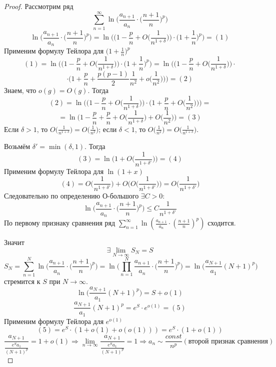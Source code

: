	\begin{proof}
		Рассмотрим ряд
		\[ \sum_{n = 1}^{\infty} \ln{\bigg(\frac{a_{n + 1}}{a_n} \cdot \bigg(\frac{n + 1}{n}\bigg)^p\bigg)} \] 
		\[ \ln{\bigg(\frac{a_{n + 1}}{a_n} \cdot \bigg(\frac{n + 1}{n}\bigg)^p\bigg)} = \ln{\bigg(\bigg(1 - \frac{p}{n} + O\bigg(\frac{1}{n^{1 + \delta}}\bigg)\bigg) \cdot \bigg(1 + \frac{1}{n}\bigg)^p\bigg)} = (1) \]
		Применим формулу Тейлора для $\big(1 + \frac{1}{n}\big)^p$
		\[ (1) = \ln{\bigg(\bigg(1 - \frac{p}{n} + O\bigg(\frac{1}{n^{1 + \delta}}\bigg)\bigg) \cdot \bigg(1 + \frac{1}{n}\bigg)^p\bigg)} = \ln{\bigg(\bigg(1 - \frac{p}{n} + O\bigg(\frac{1}{n^{1 + \delta}}\bigg)\bigg)} \cdot \]
		\[ \cdot \bigg(1 + \frac{p}{n} + \frac{p(p - 1)}{2} \frac{1}{n^2} + o\bigg(\frac{1}{n^2}\bigg)\bigg)\bigg) = (2) \]
		Знаем, что $o(g) = O(g)$. Тогда
		\[ (2) = \ln{\bigg(\bigg(1 - \frac{p}{n} + O\bigg(\frac{1}{n^{1 + \delta}}\bigg)\bigg)} \cdot \bigg(1 + \frac{p}{n} + O\bigg(\frac{1}{n^2}\bigg)\bigg)\bigg) = \]
		\[ = \ln{\bigg(1 - \frac{p}{n} + \frac{p}{n} + O\bigg(\frac{1}{n^{1 + \delta}}\bigg) + O\bigg(\frac{1}{n^2}\bigg)\bigg)} = (3) \]
	    Если $\delta > 1$, то $O\big(\frac{1}{n^{1 + \delta}}\big) = O\big(\frac{1}{n^2}\big)$; если $\delta < 1$, то $O\big(\frac{1}{n^2}\big) = O\big(\frac{1}{n^{1 + \delta}}\big)$.
	    
		Возьмём $\delta' = \min{(\delta, 1)}$. Тогда
		\[ (3) = \ln{\bigg(1 + O\bigg(\frac{1}{n^{1 + \delta'}}\bigg)\bigg)} = (4) \]
		Применим формулу Тейлора для $\ln{(1 + x)}$
		\[ (4) = O\bigg(\frac{1}{n^{1 + \delta'}}\bigg) + O\bigg(O\bigg(\frac{1}{n^{1 + \delta'}}\bigg)\bigg) = O\bigg(\frac{1}{n^{1 + \delta'}}\bigg) \]
	    Следовательно по определению О-большого $\exists C > 0:$
	    \[ \ln{\bigg(\frac{a_{n + 1}}{a_n} \cdot \bigg(\frac{n + 1}{n}\bigg)^p\bigg)} \leqslant C\frac{1}{n^{1 + \delta'}} \]
	    По первому признаку сравнения ряд $\sum_{n = 1}^{\infty} \ln{(\frac{a_{n + 1}}{a_n} \cdot (\frac{n + 1}{n})^p)}$ сходится.
	    
	    Значит
	    \[ \exists \lim_{N \to \infty} S_N = S \]
	    \[ S_N = \sum_{n = 1}^{N} \ln{\bigg(\frac{a_{n + 1}}{a_n} \cdot \bigg(\frac{n + 1}{n}\bigg)^p\bigg)} = \ln{\bigg(\prod_{n = 1}^N \frac{a_{n + 1}}{a_n} \cdot \bigg(\frac{n + 1}{n}\bigg)^p\bigg)} = \ln{\bigg(\frac{a_{N + 1}}{a_1} (N + 1)^p\bigg)} \]
	    стремится к $S$ при $N \to \infty$.
	    \[ \ln{\bigg(\frac{a_{N + 1}}{a_1} (N + 1)^p\bigg)} = S + o(1) \]
	    \[ \frac{a_{N + 1}}{a_1} (N + 1)^p = e^S \cdot e^{o(1)} = (5) \]
	    Применим формулу Тейлора для $e^{o(1)}$
	    \[ (5) = e^S \cdot (1 + o(1) + o(o(1))) = e^S \cdot (1 + o(1)) \]
	    \[ \frac{a_{N + 1}}{\frac{e^S a_1}{(N + 1)^p}} = 1 + o(1) \Rightarrow \lim_{n \to \infty} \frac{a_{N + 1}}{\frac{e^S a_1}{(N + 1)^p}} = 1 \Rightarrow a_n \sim \frac{const}{n^p} (\text{второй признак сравнения}) \]
	\end{proof}
	
